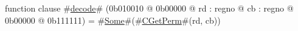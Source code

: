 function clause #\hyperref[zdecode]{decode}# (0b010010 @ 0b00000 @ rd : regno @ cb : regno @    0b00000 @ 0b111111) = #\hyperref[zSome]{Some}#(#\hyperref[zCGetPerm]{CGetPerm}#(rd, cb))
